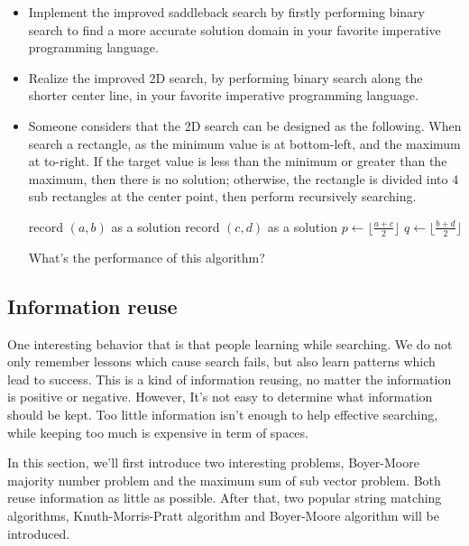 \documentclass[UTF8]{article}
\begin{document}
\begin{Exercise}
\begin{itemize}
\item Implement the improved saddleback search by firstly performing binary search to find a more accurate solution domain
in your favorite imperative programming language.
\item Realize the improved 2D search, by performing binary search along the shorter center line, in your favorite
imperative programming language.
\item Someone considers that the 2D search can be designed as the following. When search a rectangle, as the
minimum value is at bottom-left, and the maximum at to-right. If the target value is less than the minimum or
greater than the maximum, then there is no solution; otherwise, the rectangle is divided into 4 sub rectangles
at the center point, then perform recursively searching.
\begin{algorithmic}[1]
 
      \State record $(a, b)$ as a solution
    \EndIf
      \State record $(c, d)$ as a solution
    \EndIf
    \State \Return
  \EndIf
  \State $p \gets \lfloor \frac{a + c}{2} \rfloor$
  \State $q \gets \lfloor \frac{b + d}{2} \rfloor$
  \State {}
  \State {}
  \State {}
  \State {}
\EndProcedure
\end{algorithmic}
What's the performance of this algorithm?
\end{itemize}
\end{Exercise}

\subsection{Information reuse}
One interesting behavior that is that people learning while searching. We do not only
remember lessons which cause search fails, but also learn patterns which lead to success. This is a
kind of information reusing, no matter the information is positive or negative. However, It's not easy
to determine what information should be kept. Too little information isn't
enough to help effective searching, while keeping too much is expensive in term of spaces.

In this section, we'll first introduce two interesting problems, Boyer-Moore majority number problem
and the maximum sum of sub vector problem. Both reuse information as little as possible. After that, two
popular string matching algorithms, Knuth-Morris-Pratt algorithm and Boyer-Moore algorithm will be
introduced.
\end{document}
